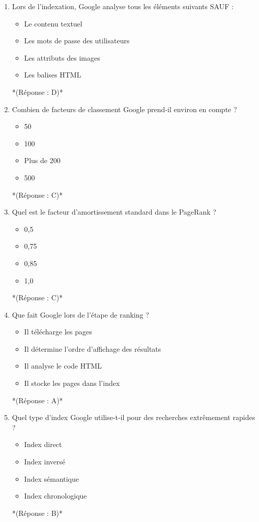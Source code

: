 \documentclass[12pt,a4paper,twoside]{report}
\begin{document}
\begin{enumerate}
\item Lors de l'indexation, Google analyse tous les éléments suivants SAUF :
\begin{itemize}
\item[A)] Le contenu textuel
\item[B)] Les mots de passe des utilisateurs
\item[C)] Les attributs des images
\item[D)] Les balises HTML
\end{itemize}
*(Réponse : D)*

\item Combien de facteurs de classement Google prend-il environ en compte ?
\begin{itemize}
\item[A)] 50
\item[B)] 100
\item[C)] Plus de 200
\item[D)] 500
\end{itemize}
*(Réponse : C)*

\item Quel est le facteur d'amortissement standard dans le PageRank ?
\begin{itemize}
\item[A)] 0,5
\item[B)] 0,75
\item[C)] 0,85
\item[D)] 1,0
\end{itemize}
*(Réponse : C)*

\item Que fait Google lors de l'étape de ranking ?
\begin{itemize}
\item[A)] Il télécharge les pages
\item[B)] Il détermine l'ordre d'affichage des résultats
\item[C)] Il analyse le code HTML
\item[D)] Il stocke les pages dans l'index
\end{itemize}
*(Réponse : A)*

\item Quel type d'index Google utilise-t-il pour des recherches extrêmement rapides ?
\begin{itemize}
\item[A)] Index direct
\item[B)] Index inversé
\item[C)] Index sémantique
\item[D)] Index chronologique
\end{itemize}
*(Réponse : B)*


\end{enumerate}
\end{document}
